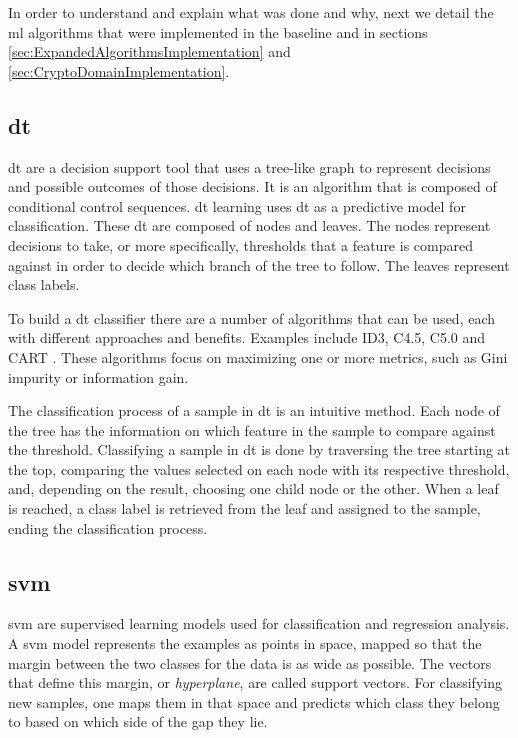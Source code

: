 In order to understand and explain what was done and why, next we detail the \ac{ml} algorithms that were implemented in the baseline and in sections \ref{sec:ExpandedAlgorithmsImplementation} and \ref{sec:CryptoDomainImplementation}.

\subsection{\acl{dt}}
\label{ssec:DecisionTrees}

\ac{dt} are a decision support tool that uses a tree-like graph to represent decisions and possible outcomes of those decisions. It is an algorithm that is composed of conditional control sequences. \ac{dt} learning uses \ac{dt} as a predictive model for classification.
These \ac{dt} are composed of nodes and leaves. The nodes represent decisions to take, or more specifically, thresholds that a feature is compared against in order to decide which branch of the tree to follow. The leaves represent class labels.

To build a \ac{dt} classifier there are a number of algorithms that can be used, each with different approaches and benefits. Examples include ID3, C4.5, C5.0 and CART \cite{strobl2009introduction}. These algorithms focus on maximizing one or more metrics, such as Gini impurity or information gain.

The classification process of a sample in \ac{dt} is an intuitive method. Each node of the tree has the information on which feature in the sample to compare against the threshold. Classifying a sample in \ac{dt} is done by traversing the tree starting at the top, comparing the values selected on each node with its respective threshold, and, depending on the result, choosing one child node or the other. When a leaf is reached, a class label is retrieved from the leaf and assigned to the sample, ending the classification process.


\subsection{\acl{svm}}
\label{ssec:SuportVectorMachines}

\ac{svm} are supervised learning models used for classification and regression analysis. A \ac{svm} model represents the examples as points in space, mapped so that the margin between the two classes for the data is as wide as possible. The vectors that define this margin, or \textit{hyperplane}, are called support vectors. For classifying new samples, one maps them in that space and predicts which class they belong to based on which side of the gap they lie.

